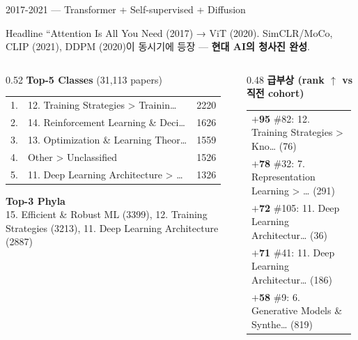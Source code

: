 \documentclass[aspectratio=169,t]{beamer}
\newcommand{\hot}[1]{\textcolor{accentorange}{\textbf{#1}}}
\newcommand{\muted}[1]{\textcolor{mutedgray}{#1}}
\begin{document}
\begin{frame}{2017-2021 \quad — \quad Transformer + Self-supervised + Diffusion}
\small
\begin{block}{Headline}
``Attention Is All You Need (2017) → ViT (2020). SimCLR/MoCo, CLIP (2021), DDPM (2020)이 동시기에 등장 — \hot{현대 AI의 청사진 완성}.
\end{block}
\vspace{4pt}

\begin{columns}[T,onlytextwidth]
\begin{column}{0.52\textwidth}
\textbf{Top-5 Classes} \muted{\scriptsize (31,113 papers)}\\[2pt]
\scriptsize
\begin{tabular}{@{}rlr@{}}
    1. & 12. Training Strategies > Trainin… & 2220 \\
    2. & 14. Reinforcement Learning \& Deci… & 1626 \\
    3. & 13. Optimization \& Learning Theor… & 1559 \\
    4. & Other > Unclassified & 1526 \\
    5. & 11. Deep Learning Architecture > … & 1326 \\
\end{tabular}
\vspace{8pt}

\textbf{\small Top-3 Phyla}\\[2pt]
\scriptsize 15. Efficient \& Robust ML (3399), 12. Training Strategies (3213), 11. Deep Learning Architecture (2887)
\end{column}

\begin{column}{0.48\textwidth}
\textbf{급부상 (rank $\uparrow$ vs 직전 cohort)}\\[2pt]
\scriptsize
\begin{tabular}{@{}p{0.95\linewidth}@{}}
    \hot{$+$95} \#82: 12. Training Strategies > Kno… (76) \\
    \hot{$+$78} \#32: 7. Representation Learning > … (291) \\
    \hot{$+$72} \#105: 11. Deep Learning Architectur… (36) \\
    \hot{$+$71} \#41: 11. Deep Learning Architectur… (186) \\
    \hot{$+$58} \#9: 6. Generative Models \& Synthe… (819) \\
\end{tabular}
\end{column}
\end{columns}
\end{frame}
\end{document}
